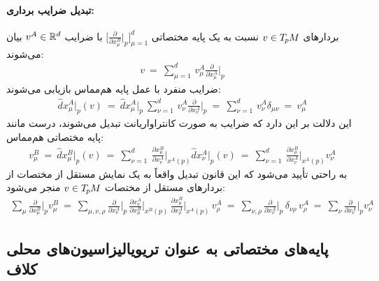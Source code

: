 \paragraph{تبدیل ضرایب برداری:}
بردارهای $v \in T_{\mkern-1.5mu p}\mkern-.5muM$ نسبت به یک پایه مختصاتی
$\big[\frac{\partial}{\partial x^B_\mu} \big|_p \big]_{\mu=1}^d$
با ضرایب $v^A \in \mathbb{R}^d$ بیان می‌شوند:
\begin{align}
	v\ =\
	\sum_{\mu=1}^d \,
	v_\mu^A \frac{\partial}{\partial x^A_\mu} \bigg|_p
\end{align}
ضرایب منفرد با عمل پایه هم‌مماس بازیابی می‌شوند:
\begin{align}
	\hat{d}x^A_\mu \big|_p(v)
	\ =\ \hat{d}x^A_\mu \big|_p\ \sum_{\nu=1}^d \, v_\nu^A \frac{\partial}{\partial x^A_\nu} \bigg|_p
	\ =\ \sum_{\nu=1}^d \, v_\nu^A \delta_{\mu\nu}
	\ =\ v^A_\mu
\end{align}
این دلالت بر این دارد که ضرایب به صورت کانتراواریانت تبدیل می‌شوند، درست مانند پایه مختصاتی هم‌مماس:
\begin{align}
	v^B_\mu
	\ =\ \hat{d}x^B_\mu \big|_p (v)
	\ =\ \sum_{\nu=1}^d\ 
	\frac{\partial x^B_\mu}{\partial x^A_\nu} \bigg|_{x^A(p)}
	\hat{d}x^A_\nu|_p (v)
	\ =\ \sum_{\nu=1}^d\ 
	\frac{\partial x^B_\mu}{\partial x^A_\nu} \bigg|_{x^A(p)}
	v^A_\nu
\end{align}
به راحتی تأیید می‌شود که این قانون تبدیل واقعاً به یک نمایش مستقل از مختصات از بردارهای مستقل از مختصات $v\in T_{\mkern-1.5mu p}\mkern-.5muM$ منجر می‌شود:
\begin{align}
	\sum_\mu \frac{\partial}{\partial x^B_\mu} \bigg|_p v_\mu^B
	\ =\ \sum_{\mu,\nu,\rho} \frac{\partial}{\partial x^A_\nu} \bigg|_p \,
	\frac{\partial x^A_\nu}{\partial x^B_\mu} \bigg|_{x^B(p)} \,
	\frac{\partial x^B_\mu}{\partial x^A_\rho} \bigg|_{x^A(p)} \,
	v^A_\rho
	\ =\ \sum_{\nu,\rho} \frac{\partial}{\partial x^A_\nu} \bigg|_p \,
	\delta_{\nu\rho} \,
	v^A_\rho
	\ =\ \sum_\nu \frac{\partial}{\partial x^A_\nu} \bigg|_p v_\nu^A
\end{align}



















\subsection{پایه‌های مختصاتی به عنوان تریویالیزاسیون‌های محلی کلاف}
\label{apx:correspondences_bundle_trivializations}

